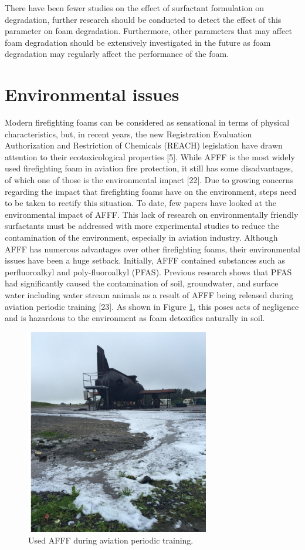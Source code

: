 \documentclass[12pt]{report}
\begin{document}
There have been fewer studies on the effect of surfactant formulation on degradation, further research should be conducted to detect the effect of this parameter on foam degradation. Furthermore, other parameters that may affect foam degradation should be extensively investigated in the future as foam degradation may regularly affect the performance of the foam.

\section{Environmental issues}
Modern firefighting foams can be considered as sensational in terms of physical characteristics, but, in recent years, the new Registration Evaluation Authorization and Restriction of Chemicals (REACH) legislation have drawn attention to their ecotoxicological properties [5]. While AFFF is the most widely used firefighting foam in aviation fire protection, it still has some disadvantages, of which one of those is the environmental impact [22]. Due to growing concerns regarding the impact that firefighting foams have on the environment, steps need to be taken to rectify this situation. To date, few papers have looked at the environmental impact of AFFF. This lack of research on environmentally friendly surfactants must be addressed with more experimental studies to reduce the contamination of the environment, especially in aviation industry.
Although AFFF has numerous advantages over other firefighting foams, their environmental issues have been a huge setback. Initially, AFFF contained substances such as perfluoroalkyl and poly-fluoroalkyl (PFAS). Previous research shows that PFAS had significantly caused the contamination of soil, groundwater, and surface water including water stream animals as a result of AFFF being released during aviation periodic training [23]. As shown in Figure \ref{ch2:figure:use}, this poses acts of negligence and is hazardous to the environment as foam detoxifies naturally in soil.

\begin{figure}[H]
    \centering
    \includegraphics[width=\textwidth,height=9cm]{use_during_aviation_training.jpg}
    \caption{Used AFFF during aviation periodic training.}
    \label{ch2:figure:use}
\end{figure}
\end{document}
